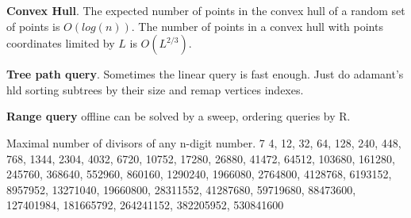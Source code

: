 \documentclass[a4paper,10pt,oneside]{article}
\begin{document}
\begin{multicols}{2}
\textbf{Convex Hull}. The expected number of points in the convex hull of a random set of points is $O(log(n))$. The number of points in a convex hull with points coordinates limited by $L$ is $O(L^{2/3})$.

\textbf{Tree path query}. Sometimes the linear query is fast enough. Just do adamant's hld sorting subtrees by their size and remap vertices indexes.

\textbf{Range query} offline can be solved by a sweep, ordering queries by R.

Maximal number of divisors of any n-digit number. 7 4, 12, 32, 64, 128, 240, 448, 768, 1344, 2304, 4032, 6720, 10752, 17280, 26880, 41472, 64512, 103680, 161280, 245760, 368640, 552960, 860160, 1290240, 1966080, 2764800, 4128768, 6193152, 8957952, 13271040, 19660800, 28311552, 41287680, 59719680, 88473600, 127401984, 181665792, 264241152, 382205952, 530841600

\end{multicols}
\end{document}
